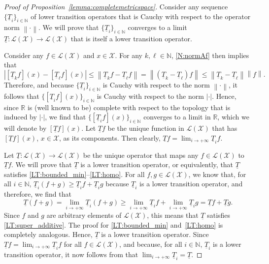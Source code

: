 \documentclass[10pt,a4paper]{paper}
\theoremstyle{definition}
\newcommand{\nats}{\mathbb{N}}
\newcommand{\reals}{\mathbb{R}}
\newcommand{\realspos}{\reals_{>0}}
\newcommand{\states}{\mathcal{X}}
\newcommand{\lt}{\underline{T}}
\newcommand{\gambles}{\mathcal{L}}
\newcommand{\gamblesX}{\gambles(\states)}
\newcommand{\norm}[1]{\left\lVert #1 \right\rVert}
\newcommand{\abs}[1]{\left\vert #1 \right\vert}
\begin{document}
\begin{proof}[Proof of Proposition~\ref{lemma:completemetricspace}]
Consider any sequence $\{\lt_i\}_{i\in\nats}$ of lower transition operators that is Cauchy with respect to the operator norm $\norm{\cdot}$. We will prove that $\{\lt_i\}_{i\in\nats}$ converges to a limit $\lt\colon\gamblesX\to\gamblesX$ that is itself a lower transition operator.

Consider any $f\in\gamblesX$ and $x\in\states$. For any $k,\ell\in\nats$, \eqref{N:normAf} then implies that
\begin{equation*}
\abs{[\lt_k f](x)-[\lt_\ell f](x)}
\leq\norm{\lt_k f-\lt_\ell f}
=\norm{(\lt_k-\lt_\ell)f}
\leq\norm{\lt_k-\lt_\ell}\norm{f}.
\end{equation*}
Therefore, and because $\{\lt_i\}_{i\in\nats}$ is Cauchy with respect to the norm $\norm{\cdot}$, it follows that $\{[\lt_i f](x)\}_{i\in\nats}$ is Cauchy with respect to the norm $\abs{\cdot}$. Hence, since $\reals$ is (well known to be) complete with respect to the topology that is induced by $\abs{\cdot}$, we find that $\{[\lt_i f](x)\}_{i\in\nats}$ converges to a limit in $\reals$, which we will denote by $[\lt f](x)$. Let $\lt f$ be the unique function in $\gamblesX$ that has $[\lt f](x)$, $x\in\states$, as its components. Then clearly, $\lt f=\lim_{i\to+\infty}\lt_if$. 

Let $\lt\colon\gamblesX\to\gamblesX$ be the unique operator that maps any $f\in\gamblesX$ to $\lt f$. We will prove that $\lt$ is a lower transition operator, or equivalently, that $\lt$ satisfies \ref{LT:bounded_min}--\ref{LT:homo}. For all $f,g\in\gamblesX$, we know that, for all $i\in\nats$, $\lt_i(f+g)\geq\lt_if+\lt_ig$ because $\lt_i$ is a lower transition operator, and therefore, we find that
\begin{equation*}
\lt(f+g)
=\lim_{i\to+\infty}\lt_i(f+g)
\geq\lim_{i\to+\infty}\lt_if
+
\lim_{i\to+\infty}\lt_ig=\lt f+\lt g.
\end{equation*}
Since $f$ and $g$ are arbitrary elements of $\gamblesX$, this means that $\lt$ satisfies \ref{LT:super_additive}. The proof for \ref{LT:bounded_min} and~\ref{LT:homo} is completely analogous. Hence, $\lt$ is a lower transition operator. Since $\lt f=\lim_{i\to+\infty}\lt_i f$ for all $f\in\gamblesX$, and because, for all $i\in\nats$, $\lt_i$ is a lower transition operator, it now follows from \cite[Proposition~1]{DeBock:2016} that $\lim_{i\to+\infty}\lt_i=\lt$.
\end{proof}
\end{document}
